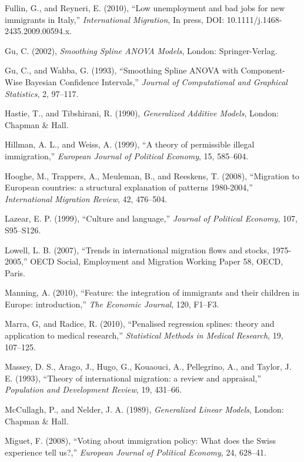 \documentclass[10pt] {article}
\theoremstyle{definition}
\theoremstyle{plain}
\begin{document}
\begin{thebibliography}{99}
\bibitem{} Fullin, G., and Reyneri, E. (2010), ``Low unemployment and bad jobs for new immigrants in Italy,'' \textit{International Migration}, In press, DOI: 10.1111/j.1468-2435.2009.00594.x.

\bibitem{} Gu, C. (2002), \textit{Smoothing Spline ANOVA Models}, London: Springer-Verlag.

\bibitem{} Gu, C., and Wahba, G. (1993), ``Smoothing Spline ANOVA with Component-Wise Bayesian Confidence Intervals,'' \textit{Journal of Computational and Graphical Statistics}, 2, 97--117.

\bibitem{} Hastie, T., and Tibshirani, R. (1990), \textit{Generalized Additive Models}, London: Chapman $\&$ Hall.

\bibitem{} Hillman, A. L., and Weiss, A. (1999), ``A theory of permissible illegal immigration,'' \textit{European Journal of Political Economy}, 15, 585--604.

\bibitem{} Hooghe, M., Trappers, A., Meuleman, B., and Reeskens, T. (2008), ``Migration to European countries: a structural explanation of patterns 1980-2004,'' \textit{International Migration Review}, 42, 476--504.

\bibitem{} Lazear, E. P. (1999), ``Culture and language,'' \textit{Journal of Political Economy}, 107, S95--S126.

\bibitem{} Lowell, L. B. (2007), ``Trends in international migration flows and stocks, 1975-2005,'' OECD Social, Employment and Migration Working Paper 58, OECD, Paris.

\bibitem{} Manning, A. (2010), ``Feature: the integration of immigrants and their children in Europe: introduction,'' \textit{The Economic Journal}, 120, F1--F3. 

\bibitem{} Marra, G, and Radice, R. (2010), ``Penalised regression splines: theory and application to medical research,'' \textit{Statistical Methods in Medical Research}, 19, 107--125.

\bibitem{} Massey, D. S., Arago, J., Hugo, G., Kouaouci, A., Pellegrino, A., and Taylor, J. E. (1993), ``Theory of international migration: a review and appraisal,'' \textit{Population and Development Review}, 19, 431--66.

\bibitem{} McCullagh, P., and Nelder, J. A. (1989), \textit{Generalized Linear Models}, London: Chapman $\&$ Hall.

\bibitem{} Miguet, F. (2008), ``Voting about immigration policy: What does the Swiss experience tell us?,'' \textit{European Journal of Political Economy}, 24, 628--41.


\end{thebibliography}
\end{document}
